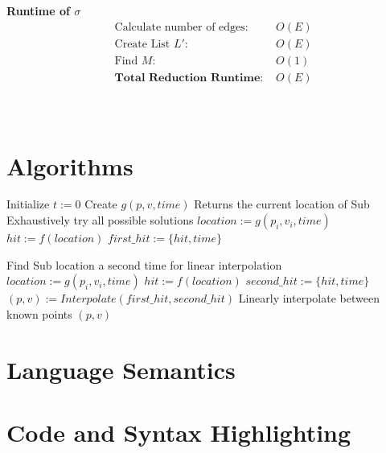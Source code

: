 \documentclass[11pt]{article}
\begin{document}
\textbf{Runtime of $\sigma$}
\begin{align*}
&\text{Calculate number of edges: } &O(E)\\ 
&\text{Create List $L'$: } &O(E)\\ 
&\text{Find $M$: } &O(1)\\
&\textbf{Total Reduction Runtime: } &O(E)\\
\end{align*}

\begin{center}
\quad{}\quad{}\\
\end{center}

\section{Algorithms}
\begin{algorithmic}[1]
\State Initialize $t:=0$
\State Create $g(p,v,time)$
\Comment Returns the current location of Sub 
\Comment  Exhaustively try all possible solutions
\State $location := g(p_i,v_i,time)$
\State $hit := f(location)$
 $first\_hit := \{hit, time\}$
\EndIf
\EndFor

\Comment  Find Sub location a second time for linear interpolation
\State $location := g(p_i,v_i,time)$
\State $hit := f(location)$
 $second\_hit := \{hit, time\}$
\EndIf
\EndFor
\State $(p, v) := Interpolate(first\_hit, second\_hit)$
\Comment Linearly interpolate between known points
\Return $(p, v)$

\end{algorithmic}

\section{Language Semantics}
\vspace{8mm}

\section{Code and Syntax Highlighting}
\end{document}
